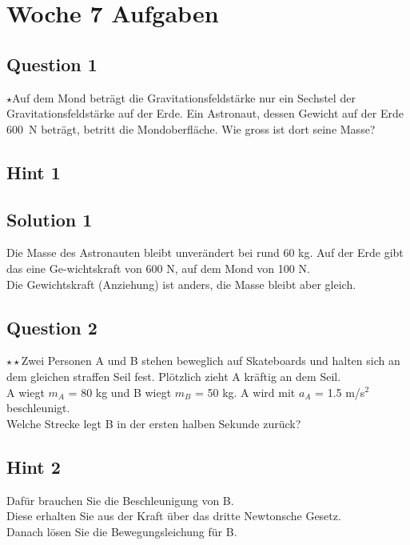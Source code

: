 \documentclass{article}
\begin{document}
\section*{Woche 7 Aufgaben}
\subsection*{Question 1}
$\star$Auf dem Mond beträgt die Gravitationsfeldstärke nur ein Sechstel der Gravitationsfeldstärke auf der Erde. Ein Astronaut, dessen Gewicht auf der Erde 600~N beträgt, betritt die Mondoberfläche. Wie gross ist dort seine Masse?
\subsection*{Hint 1}
\subsection*{Solution 1}
Die Masse des Astronauten bleibt unverändert bei rund 60 kg. Auf der Erde gibt das eine Ge-wichtskraft von 600 N, auf dem Mond von 100 N.\\
Die Gewichtskraft (Anziehung) ist anders, die Masse bleibt aber gleich.
\subsection*{Question 2}
$\star\star$Zwei Personen A und B stehen beweglich auf Skateboards und halten sich an dem gleichen straffen Seil fest. Plötzlich zieht A kräftig an dem Seil.\\
A wiegt $m_A$ = 80 kg und B wiegt $m_B$ = 50 kg. A wird mit $a_A$ = 1.5 m/s$^2$ beschleunigt.\\
Welche Strecke legt B in der ersten halben Sekunde zurück?
\subsection*{Hint 2}
Dafür brauchen Sie die Beschleunigung von B. \\
Diese erhalten Sie aus der Kraft über das dritte Newtonsche Gesetz. \\
Danach lösen Sie die Bewegungsleichung für B.
\end{document}
